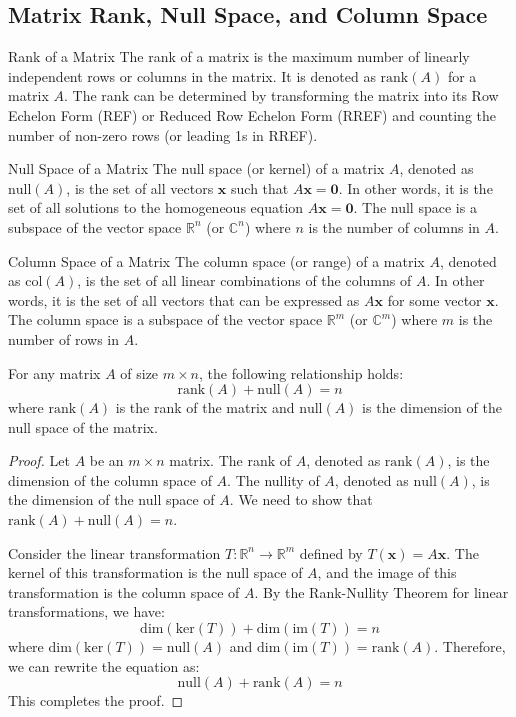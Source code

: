 \documentclass[openany]{book}
\begin{document}
\subsection{Matrix Rank, Null Space, and Column Space}
\begin{mydefinition}{Rank of a Matrix}
The rank of a matrix is the maximum number of linearly independent rows or columns in the matrix. It is denoted as $\text{rank}(A)$ for a matrix $A$. The rank can be determined by transforming the matrix into its Row Echelon Form (REF) or Reduced Row Echelon Form (RREF) and counting the number of non-zero rows (or leading 1s in RREF).
\end{mydefinition}
\begin{mydefinition}{Null Space of a Matrix}
The null space (or kernel) of a matrix $A$, denoted as $\text{null}(A)$, is the set of all vectors $\mathbf{x}$ such that $A\mathbf{x} = \mathbf{0}$. In other words, it is the set of all solutions to the homogeneous equation $A\mathbf{x} = \mathbf{0}$. The null space is a subspace of the vector space $\mathbb{R}^n$ (or $\mathbb{C}^n$) where $n$ is the number of columns in $A$.
\end{mydefinition}
\begin{mydefinition}{Column Space of a Matrix}
The column space (or range) of a matrix $A$, denoted as $\text{col}(A)$, is the set of all linear combinations of the columns of $A$. In other words, it is the set of all vectors that can be expressed as $A\mathbf{x}$ for some vector $\mathbf{x}$. The column space is a subspace of the vector space $\mathbb{R}^m$ (or $\mathbb{C}^m$) where $m$ is the number of rows in $A$.
\end{mydefinition}
\begin{mytheorem}
For any matrix $A$ of size $m \times n$, the following relationship holds:
\[
\text{rank}(A) + \text{null}(A) = n
\]
where $\text{rank}(A)$ is the rank of the matrix and $\text{null}(A)$ is the dimension of the null space of the matrix.
\end{mytheorem}
\begin{proof}
    Let $A$ be an $m \times n$ matrix. The rank of $A$, denoted as $\text{rank}(A)$, is the dimension of the column space of $A$. The nullity of $A$, denoted as $\text{null}(A)$, is the dimension of the null space of $A$. We need to show that $\text{rank}(A) + \text{null}(A) = n$.
    
    Consider the linear transformation $T: \mathbb{R}^n \to \mathbb{R}^m$ defined by $T(\mathbf{x}) = A\mathbf{x}$. The kernel of this transformation is the null space of $A$, and the image of this transformation is the column space of $A$. By the Rank-Nullity Theorem for linear transformations, we have:
    \[
    \text{dim}(\text{ker}(T)) + \text{dim}(\text{im}(T)) = n
    \]
    where $\text{dim}(\text{ker}(T)) = \text{null}(A)$ and $\text{dim}(\text{im}(T)) = \text{rank}(A)$. Therefore, we can rewrite the equation as:
    \[
    \text{null}(A) + \text{rank}(A) = n
    \]
    This completes the proof.
\end{proof}
\end{document}
